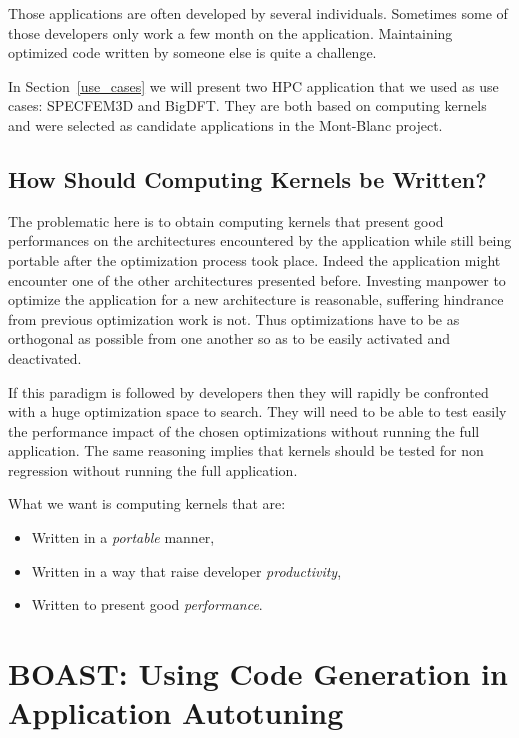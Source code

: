 \documentclass[11pt, a4paper, twoside]{montblanc}
\begin{document}
Those applications are often developed by several individuals. Sometimes some of
those developers only work a few month on the application. Maintaining optimized
code written by someone else is quite a challenge.

In Section~\ref{use_cases} we will present two HPC application that we used
as use cases: SPECFEM3D and BigDFT. They are both based on computing
kernels and were selected as candidate applications in the Mont-Blanc project.

  \subsection{How Should Computing Kernels be Written?}

The problematic here is to obtain computing kernels that present good
performances on the architectures encountered by the application while still
being portable after the optimization process took place. Indeed the application
might encounter one of the other architectures presented before. Investing
manpower to optimize the application for a new architecture is reasonable,
suffering hindrance from previous optimization work is not. Thus optimizations
have to be as orthogonal as possible from one another so as to be easily
activated and deactivated.

If this paradigm is followed by developers then they will rapidly be confronted
with a huge optimization space to search. They will need to be able to test
easily the performance impact of the chosen optimizations without running the
full application. The same reasoning implies that kernels should be tested for
non regression without running the full application.

What we want is computing kernels that are:
\begin{itemize}
\item Written in a \emph{portable} manner,
\item Written in a way that raise developer \emph{productivity},
\item Written to present good \emph{performance}.
\end{itemize}

\section{BOAST: Using Code Generation in Application Autotuning}
\end{document}
